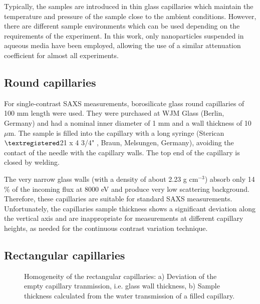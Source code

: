 Typically, the samples are introduced in thin glass capillaries which maintain the temperature and pressure of the sample close to the ambient conditions. However, there are different sample environments which can be used depending on the requirements of the experiment. In this work, only nanoparticles suspended in aqueous media have been employed, allowing the use of a similar attenuation coefficient for almost all experiments.

\subsection{Round capillaries}

For single-contrast SAXS measurements, borosilicate glass round capillaries of 100 mm length were used. They were purchased at WJM Glass (Berlin, Germany) and had a nominal inner diameter of 1 mm and a wall thickness of 10 $\mu$m. The sample is filled into the capillary with a long syringe (Sterican$\textregistered$21 x 4 3/4" , Braun, Melsungen, Germany), avoiding the contact of the needle with the capillary walls. The top end of the capillary is closed by welding.

The very narrow glass walls (with a density of about 2.23 g cm$^{-3}$) absorb only 14 $\%$ of the incoming flux at 8000 eV and produce very low scattering background. Therefore, these capillaries are suitable for standard SAXS measurements. Unfortunately, the capillaries sample thickness shows a significant deviation along the vertical axis and are inappropriate for measurements at different capillary heights, as needed for the continuous contrast variation technique.

\subsection{Rectangular capillaries}

\begin{figure}%
	\centering
		\caption[Homogeneity of the rectangular capillaries.]{Homogeneity of the rectangular capillaries: a) Deviation of the empty capillary tranmission, i.e. glass wall thickness, b) Sample thickness calculated from the water transmission of a filled capillary. }
\end{figure}

